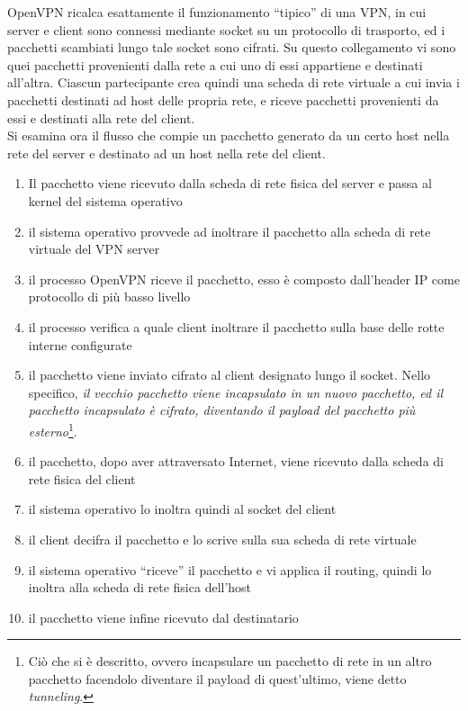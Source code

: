 OpenVPN ricalca esattamente il funzionamento ``tipico'' di una VPN, in cui server e client
sono connessi mediante socket su un protocollo di trasporto, ed i pacchetti scambiati
lungo tale socket sono cifrati.
Su questo collegamento vi sono quei pacchetti provenienti dalla rete a cui uno di essi
appartiene e destinati all'altra. Ciascun partecipante crea quindi una scheda di rete
virtuale a cui invia i pacchetti destinati ad host delle propria rete, e riceve
pacchetti provenienti da essi e destinati alla rete del client.\\
Si esamina ora il flusso che compie un pacchetto generato da un certo host nella rete
del server e destinato ad un host nella rete del client.
\begin{enumerate}
	\item Il pacchetto viene ricevuto dalla scheda di rete fisica del server e passa
	      al kernel del sistema operativo
	\item il sistema operativo provvede ad inoltrare il pacchetto alla scheda di rete
	      virtuale del VPN server
	\item il processo OpenVPN riceve il pacchetto, esso è composto dall'header IP come
	      protocollo di più basso livello
	\item il processo verifica a quale client inoltrare il pacchetto sulla base delle rotte
	      interne configurate
	\item il pacchetto viene inviato cifrato al client designato lungo il socket. Nello
	      specifico, \textit{il vecchio pacchetto viene incapsulato in un nuovo pacchetto,
	      	ed il pacchetto incapsulato è cifrato, diventando il payload del pacchetto
	      	più esterno}\footnote{Ciò che si è descritto, ovvero incapsulare un pacchetto di rete
	      	in un altro pacchetto facendolo diventare il payload di quest'ultimo, viene detto
	      	\textit{tunneling}.}.
	\item il pacchetto, dopo aver attraversato Internet, viene ricevuto dalla scheda di rete
	      fisica del client
	\item il sistema operativo lo inoltra quindi al socket del client
	\item il client decifra il pacchetto e lo scrive sulla sua scheda di rete virtuale
	\item il sistema operativo ``riceve'' il pacchetto e vi applica il routing, quindi
	      lo inoltra alla scheda di rete fisica dell'host
	\item il pacchetto viene infine ricevuto dal destinatario
\end{enumerate}

